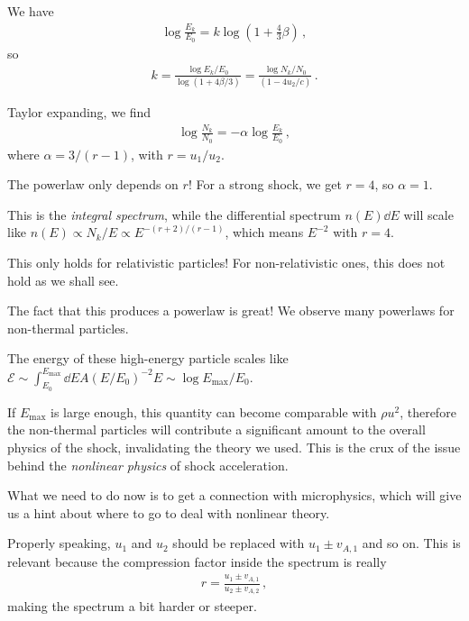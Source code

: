 \documentclass[main.tex]{subfiles}
\begin{document}
We have 
%
\begin{align}
\log \frac{E_k}{E_0 } = k \log \left(1 + \frac{4}{3} \beta \right)
\,,
\end{align}
%
so 
%
\begin{align}
k = \frac{\log E_k /E_0}{\log (1 + 4\beta /3)} = \frac{\log N_k / N_0 }{(1 - 4 u_2 / c)}
\,.
\end{align}

Taylor expanding, we find 
%
\begin{align}
\log \frac{N_k}{N_0 } = - \alpha \log \frac{E_k}{E_0}
\,,
\end{align}
%
where \(\alpha = 3 / (r-1)\), with \(r = u_1 / u_2 \). 

The powerlaw only depends on \(r\)! 
For a strong shock, we get \(r = 4\), so \(\alpha = 1\).

This is the \emph{integral spectrum}, while the differential spectrum \(n(E) \dd{E}\) will scale like \(n(E) \propto N_k / E \propto E^{- (r+2) / (r-1)}\), which means \(E^{-2}\) with \(r = 4\). 

This only holds for relativistic particles! 
For non-relativistic ones, this does not hold as we shall see.
 
The fact that this produces a powerlaw is great! We observe many powerlaws for non-thermal particles.

The energy of these high-energy particle scales like  \(\mathcal{E} \sim \int_{E_0 }^{E _{\text{max}}} \dd{E} A (E/E_0)^{-2} E \sim \log E _{\text{max}} / E_0 \).

If \(E _{\text{max}}\) is large enough, this quantity can become comparable with \(\rho u^2\), therefore the non-thermal particles will contribute a significant amount to the overall physics of the shock, invalidating the theory we used. 
This is the crux of the issue behind the \emph{nonlinear physics} of shock acceleration. 

What we need to do now is to get a connection with microphysics, which will give us a hint about where to go to deal with nonlinear theory. 

Properly speaking, \(u_1 \) and \(u_2 \) should be replaced with \(u_1 \pm v_{A, 1}\) and so on. 
This is relevant because the compression factor inside the spectrum is really 
%
\begin{align}
r = \frac{u_1 \pm v_{A, 1}}{u_2 \pm v_{A, 2}}
\,,
\end{align}
%
making the spectrum a bit harder or steeper. 
\end{document}
